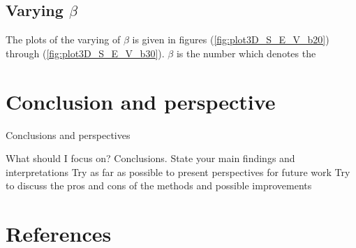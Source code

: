 \documentclass{article}
\begin{document}
\subsection{Varying \texorpdfstring{$\beta$}{TEXT}}

    The plots of the varying of $\beta$ is given in figures (\ref{fig:plot3D_S_E_V_b20}) through (\ref{fig:plot3D_S_E_V_b30}). $\beta$ is the number which denotes the






\vspace{1cm}

\section{Conclusion and perspective} \label{sec:Conclusion}

Conclusions and perspectives


What should I focus on? Conclusions.
State your main findings and interpretations
Try as far as possible to present perspectives for future work
Try to discuss the pros and cons of the methods and possible improvements


\vspace{1cm}

\section{References} \label{sec:References}

\end{document}
